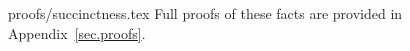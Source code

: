 \ifonecolumn
{proofs/succinctness.tex}
\else
Full proofs of these facts are provided in Appendix~\ref{sec.proofs}.
\fi

%
%
%
